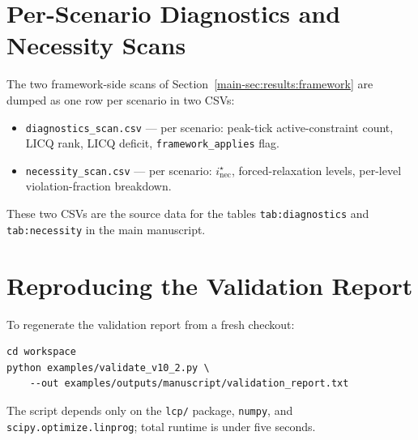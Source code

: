 \documentclass[journal, twocolumn]{IEEEtran}
\begin{document}
\section{Per-Scenario Diagnostics and Necessity Scans}

The two framework-side scans of Section~\ref{main-sec:results:framework} are dumped as one row per scenario in two CSVs:

\begin{itemize}[leftmargin=*,noitemsep]
\item \texttt{diagnostics\_scan.csv} --- per scenario: peak-tick active-constraint count, LICQ rank, LICQ deficit, \texttt{framework\_applies} flag.
\item \texttt{necessity\_scan.csv} --- per scenario: $i^\star_{\mathrm{nec}}$, forced-relaxation levels, per-level violation-fraction breakdown.
\end{itemize}

These two CSVs are the source data for the tables \texttt{tab:diagnostics} and \texttt{tab:necessity} in the main manuscript.

\section{Reproducing the Validation Report}

To regenerate the validation report from a fresh checkout:

\begin{verbatim}
cd workspace
python examples/validate_v10_2.py \
    --out examples/outputs/manuscript/validation_report.txt
\end{verbatim}

The script depends only on the \texttt{lcp/} package, \texttt{numpy}, and \texttt{scipy.optimize.linprog}; total runtime is under five seconds.
\end{document}
